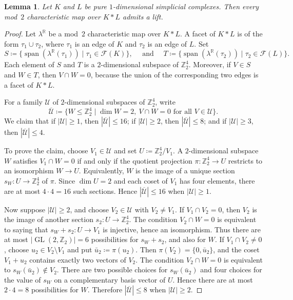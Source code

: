 \documentclass{amsart}
\newcommand{\Z}{\mathbb{Z}}
\newcommand{\R}{\mathbb{R}}
\newcommand{\cF}{\mathcal{F}}
\newcommand{\cU}{\mathcal{U}}
\DeclareMathOperator{\GL}{GL}
\DeclareMathOperator{\Span}{span}
\newtheorem{lemma}[theorem]{Lemma}
\theoremstyle{definition}
\theoremstyle{remark}
\begin{document}
\begin{lemma}\label{lem:join-1-1}
    Let $K$ and $L$ be pure $1$-dimensional simplicial complexes.
    Then every mod~$2$ characteristic map over $K\ast L$ admits a lift.
\end{lemma}
\begin{proof}
    Let $\lambda^\R$ be a mod~$2$ characteristic map over $K\ast L$.
    A facet of $K\ast L$ is of the form $\tau_1\cup\tau_2$, where $\tau_1$ is an edge of $K$ and $\tau_2$ is an edge of $L$.
    Set
    $$
        S\coloneq\{\Span(\lambda^\R(\tau_1))\mid \tau_1\in\cF(K)\},\quad \text{ and } \quad T\coloneq\{\Span(\lambda^\R(\tau_2))\mid \tau_2\in\cF(L)\}.
    $$
    Each element of $S$ and $T$ is a $2$-dimensional subspace of $\Z_2^4$.
    Moreover, if $V\in S$ and $W\in T$, then $V\cap W=0$, because the union of the corresponding two edges is a facet of $K\ast L$.

    For a family $\cU$ of $2$-dimensional subspaces of $\Z_2^4$, write
    $$
        \overline{\cU}\coloneq\{W\le \Z_2^4\mid \dim W=2,\ V\cap W=0\text{ for all }V\in\cU\}.
    $$
    We claim that if $|\cU|\ge 1$, then $|\overline{\cU}|\le16$; if $|\cU|\ge2$, then $|\overline{\cU}|\le8$; and if $|\cU|\ge3$, then $|\overline{\cU}|\le4$.

    To prove the claim, choose $V_1\in\cU$ and set $U\coloneq \Z_2^4/V_1$.
    A $2$-dimensional subspace~$W$ satisfies $V_1\cap W=0$ if and only if the quotient projection $\pi\colon\Z_2^4\to U$ restricts to an isomorphism $W\to U$.
    Equivalently, $W$ is the image of a unique section $s_W\colon U\to\Z_2^4$ of $\pi$.
    Since $\dim U=2$ and each coset of $V_1$ has four elements, there are at most $4\cdot4=16$ such sections.
    Hence $|\overline{\cU}|\le16$ when $|\cU|\ge1$.

    Now suppose $|\cU|\ge2$, and choose $V_2\in\cU$ with $V_2\ne V_1$.
    If $V_1\cap V_2=0$, then $V_2$ is the image of another section $s_2\colon U\to\Z_2^4$.
    The condition $V_2\cap W=0$ is equivalent to saying that $s_W+s_2\colon U\to V_1$ is injective, hence an isomorphism.
    Thus there are at most $|\GL(2,\Z_2)|=6$ possibilities for $s_W + s_2$, and also for $W$.
    If $V_1\cap V_2\ne0$, choose $u_2\in V_2\setminus V_1$ and put $\bar u_2\coloneq\pi(u_2)$.
    Then $\pi(V_2)=\{0,\bar u_2\}$, and the coset $V_1+u_2$ contains exactly two vectors of $V_2$.
    The condition $V_2\cap W=0$ is equivalent to $s_W(\bar u_2)\notin V_2$.
    There are two possible choices for $s_W(\bar u_2)$ and four choices for the value of $s_W$ on a complementary basis vector of $U$.
    Hence there are at most $2\cdot4=8$ possibilities for $W$.
    Therefore $|\overline{\cU}|\le8$ when $|\cU|\ge2$.


\end{proof}
\end{document}
